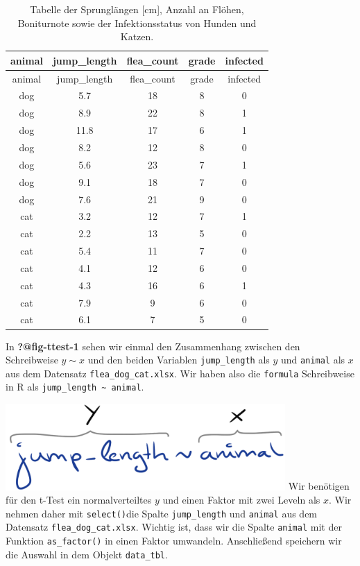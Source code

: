 \documentclass[
  letterpaper,
]{scrbook}
\begin{document}
\hypertarget{tbl-data-ttest}{}
\begin{longtable}[]{@{}ccccc@{}}
\caption{\label{tbl-data-ttest}Tabelle der Sprunglängen {[}cm{]}, Anzahl
an Flöhen, Boniturnote sowie der Infektionsstatus von Hunden und
Katzen.}\tabularnewline
\toprule()
animal & jump\_length & flea\_count & grade & infected \\
\midrule()
\endfirsthead
\toprule()
animal & jump\_length & flea\_count & grade & infected \\
\midrule()
\endhead
dog & 5.7 & 18 & 8 & 0 \\
dog & 8.9 & 22 & 8 & 1 \\
dog & 11.8 & 17 & 6 & 1 \\
dog & 8.2 & 12 & 8 & 0 \\
dog & 5.6 & 23 & 7 & 1 \\
dog & 9.1 & 18 & 7 & 0 \\
dog & 7.6 & 21 & 9 & 0 \\
cat & 3.2 & 12 & 7 & 1 \\
cat & 2.2 & 13 & 5 & 0 \\
cat & 5.4 & 11 & 7 & 0 \\
cat & 4.1 & 12 & 6 & 0 \\
cat & 4.3 & 16 & 6 & 1 \\
cat & 7.9 & 9 & 6 & 0 \\
cat & 6.1 & 7 & 5 & 0 \\
\bottomrule()
\end{longtable}

In \textbf{?@fig-ttest-1} sehen wir einmal den Zusammenhang zwischen den
Schreibweise \(y \sim x\) und den beiden Variablen \texttt{jump\_length}
als \(y\) und \texttt{animal} als \(x\) aus dem Datensatz
\texttt{flea\_dog\_cat.xlsx}. Wir haben also die \texttt{formula}
Schreibweise in R als \texttt{jump\_length\ \textasciitilde{}\ animal}.

\includegraphics[width=0.8\textwidth,height=\textheight]{./images/statistical_modeling_1.png}
Wir benötigen für den t-Test ein normalverteiltes \(y\) und einen Faktor
mit zwei Leveln als \(x\). Wir nehmen daher mit \texttt{select()}die
Spalte \texttt{jump\_length} und \texttt{animal} aus dem Datensatz
\texttt{flea\_dog\_cat.xlsx}. Wichtig ist, dass wir die Spalte
\texttt{animal} mit der Funktion \texttt{as\_factor()} in einen Faktor
umwandeln. Anschließend speichern wir die Auswahl in dem Objekt
\texttt{data\_tbl}.
\end{document}
